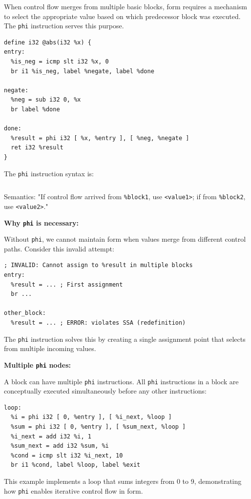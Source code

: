 When control flow merges from multiple basic blocks,  form requires a mechanism to select the appropriate value based on which predecessor block was executed. The \texttt{phi} instruction serves this purpose.

\begin{lstlisting}[style=ir]
define i32 @abs(i32 %x) {
entry:
  %is_neg = icmp slt i32 %x, 0
  br i1 %is_neg, label %negate, label %done

negate:
  %neg = sub i32 0, %x
  br label %done

done:
  %result = phi i32 [ %x, %entry ], [ %neg, %negate ]
  ret i32 %result
}
\end{lstlisting}

The \texttt{phi} instruction syntax is:

\begin{lstlisting}[style=ir]
%result = phi <type> [ <value1>, %block1 ], [ <value2>, %block2 ], ...
\end{lstlisting}

Semantics: "If control flow arrived from \texttt{\%block1}, use \texttt{<value1>}; if from \texttt{\%block2}, use \texttt{<value2>}."

\textbf{Why \texttt{phi} is necessary:}

Without \texttt{phi}, we cannot maintain  form when values merge from different control paths. Consider this invalid attempt:

\begin{lstlisting}[style=ir]
; INVALID: Cannot assign to %result in multiple blocks
entry:
  %result = ... ; First assignment
  br ...

other_block:
  %result = ... ; ERROR: violates SSA (redefinition)
\end{lstlisting}

The \texttt{phi} instruction solves this by creating a single assignment point that selects from multiple incoming values.

\textbf{Multiple \texttt{phi} nodes:}

A block can have multiple \texttt{phi} instructions. All \texttt{phi} instructions in a block are conceptually executed simultaneously before any other instructions:

\begin{lstlisting}[style=ir]
loop:
  %i = phi i32 [ 0, %entry ], [ %i_next, %loop ]
  %sum = phi i32 [ 0, %entry ], [ %sum_next, %loop ]
  %i_next = add i32 %i, 1
  %sum_next = add i32 %sum, %i
  %cond = icmp slt i32 %i_next, 10
  br i1 %cond, label %loop, label %exit
\end{lstlisting}

This example implements a loop that sums integers from 0 to 9, demonstrating how \texttt{phi} enables iterative control flow in  form.
